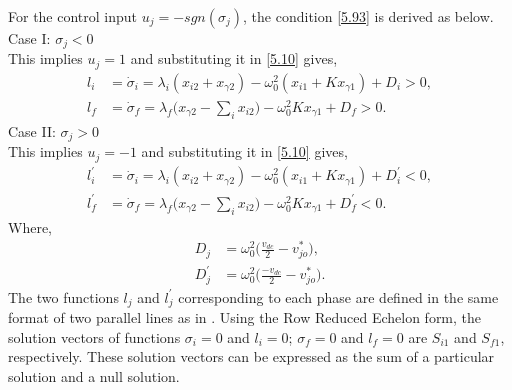 For the control input $u_{j} = -sgn(\sigma_j)$, the condition \eqref{5.93} is derived as below. \\
Case I: $\sigma_j < 0$\\ This implies $u_j = 1$ and substituting it in \eqref{5.10} gives,
\begin{equation} \label{5.101} %
\begin{aligned}
l_{i} & = \dot{\sigma}_i = \lambda_i (x_{i2} + x_{\gamma 2} ) - \omega^{2}_{0}(x_{i1} + Kx_{\gamma 1} ) +  D_{i} > 0, \\
l_{f} & = \dot{\sigma}_f = \lambda_f \Big(x_{\gamma 2} - \sum_i x_{i2} \Big) - \omega^{2}_{0} Kx_{\gamma 1} +  D_{f} > 0.
\end{aligned}
\end{equation}
Case II: $\sigma_{j} > 0$ \\ This implies $u_j = -1$ and substituting it in \eqref{5.10} gives,%
\begin{equation} \label{5.102} %
\begin{aligned}
l^{\prime}_{i} & = \dot{\sigma}_i = \lambda_i (x_{i2} + x_{\gamma 2} ) - \omega^{2}_{0}(x_{i1} + Kx_{\gamma 1} ) +  D^{\prime}_{i} < 0, \\
l^{\prime}_{f} & = \dot{\sigma}_f = \lambda_f \Big(x_{\gamma 2} - \sum_i x_{i2} \Big) - \omega^{2}_{0} Kx_{\gamma 1} +  D^{\prime}_{f} < 0.
\end{aligned}
\end{equation}
Where,
\begin{equation*} \label{5.103}
\begin{aligned}
D_{j} & = \omega^{2}_{0}\Big(\frac{v_{dc}}{2} - v^{*}_{jo} \Big),   \\
D^{\prime}_{j} & = \omega^{2}_{0}\Big(\frac{-v_{dc}}{2} - v^{*}_{jo}  \Big) .
\end{aligned}
\end{equation*}
The two functions $l_{j} $ and $l^{\prime}_{j} $ corresponding to each phase are defined in the same format of two parallel lines as in \cite{7506128}. Using the Row Reduced Echelon form, the solution vectors of functions $\sigma_i = 0$ and $l_{i} = 0$; $\sigma_f = 0$ and $l_{f} = 0$ are $S_{i1}$ and $ S_{f1}$, respectively. These solution vectors can be expressed as the sum of a particular solution and a null solution.
